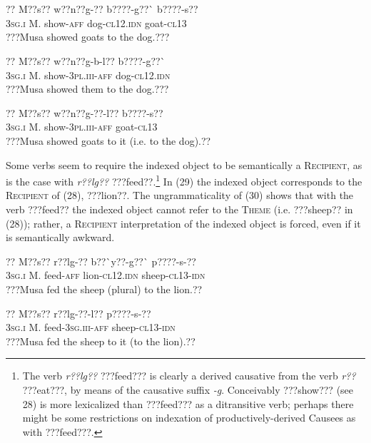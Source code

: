 \documentclass[output=paper]{langsci/langscibook}
\begin{document}
\section{}

\ea \gll 
\label{bkm:Ref424217838}??    M??s??  w??n??g-??  b????-g??\`{ }    b????-s??
\\
%
\textsc{3sg.i  }  M.  show-\textsc{aff}  dog-\textsc{cl12.idn}  goat-\textsc{cl13}
\\\glt
???Musa showed goats to the dog.???
\z


\ea \gll 
??    M??s??  w??n??g-b-l??    b????-g??\`{ }
\\
%
\textsc{3sg.i    }M.  show-\textsc{3pl.iii-aff}  dog-\textsc{cl12.idn}
\\\glt
???Musa showed them to the dog.???  
\z


\ea \gll 
\label{bkm:Ref424317424}??    M??s??  w??n??g-??-l??    b????-s??
\\
%
\textsc{3sg.i  }  M.  show-\textsc{3pl.iii-aff}  goat-\textsc{cl13}
\\\glt
???Musa showed goats to it (i.e. to the dog).??
\z

Some verbs seem to require the indexed object to be semantically a \textsc{Recipient}, as is the case with \textit{r??lg??} ???feed??.\footnote{ The verb \textit{r??lg??} ???feed??? is clearly a derived causative from the verb \textit{r??} ???eat???, by means of the causative suffix \textit{{}-g}. Conceivably ???show??? (see 28) is more lexicalized than ???feed??? as a ditransitive verb; perhaps there might be some restrictions on indexation of productively-derived Causees as with ???feed???.}{ }In (29) the indexed object corresponds to the \textsc{Recipient} of (28), ???lion??. The ungrammaticality of (30) shows that with the verb ???feed?? the indexed object cannot refer to the \textsc{Theme} (i.e. ???sheep?? in (28)); rather, a \textsc{Recipient} interpretation of the indexed object is forced, even if it is semantically awkward.


\ea \gll 
\label{bkm:Ref424335625}??    M??s??  r??lg-??    b??\`{ }y??-g??\`{ }    p????-s-??
\\
%
\textsc{3sg.i  }  M.  feed-\textsc{aff}  lion-\textsc{cl12.idn}  sheep-\textsc{cl13-idn}
\\\glt
???Musa fed the sheep (plural) to the lion.??
\z


\ea \gll 
\label{bkm:Ref424317641}??    M??s??    r??lg-??-l??    p????-s-??
\\
%
\textsc{3sg.i  }  M.    feed-\textsc{3sg.iii-aff}  sheep-\textsc{cl13-idn}
\\\glt
???Musa fed the sheep to it (to the lion).??
\z
\end{document}
